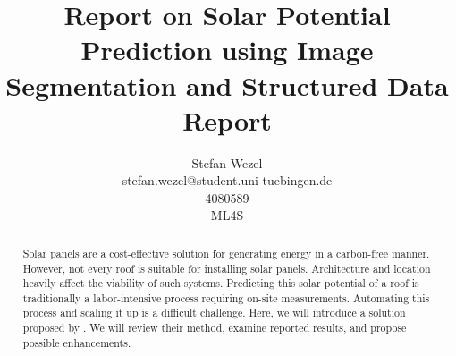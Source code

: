 \documentclass{article} %
\title{Report on Solar Potential Prediction using Image Segmentation and Structured Data\\ \vspace{0.5cm}\large{Report}}
\author{Stefan Wezel \\ stefan.wezel@student.uni-tuebingen.de \\4080589  \\ ML4S}
\def\figwidth{.5\linewidth}
\def\figheight{.15\textheight}
\begin{document}
\maketitle

\begin{abstract}
	Solar panels are a cost-effective solution for generating energy in a carbon-free manner. However, not every roof is suitable for installing solar panels. Architecture and location heavily affect the viability of such systems.
	Predicting this solar potential of a roof is traditionally a labor-intensive process requiring on-site measurements. Automating this process and scaling it up is a difficult challenge. Here, we will introduce a solution proposed by \citet{de2021predicting}. We will review their method, examine reported results, and propose possible enhancements.
\end{abstract}
\end{document}
